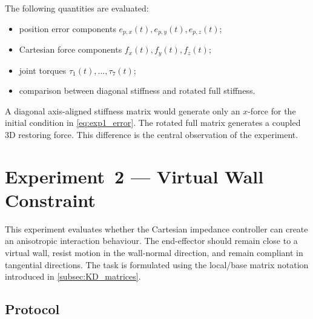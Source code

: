 The following quantities are evaluated:
\begin{itemize}
  \item position error components \(e_{p,x}(t),e_{p,y}(t),e_{p,z}(t)\);
  \item Cartesian force components \(f_x(t),f_y(t),f_z(t)\);
  \item joint torques \(\tau_1(t),\ldots,\tau_7(t)\);
  \item comparison between diagonal stiffness and rotated full stiffness.
\end{itemize}

A diagonal axis-aligned stiffness matrix would generate only an \(x\)-force for
the initial condition in \cref{eq:exp1_error}. The rotated full matrix generates
a coupled 3D restoring force. This difference is the central observation of the
experiment.


\section{Experiment~2 --- Virtual Wall Constraint}
\label{sec:exp_wall}

This experiment evaluates whether the Cartesian impedance controller can create
an anisotropic interaction behaviour. The end-effector should remain close to a
virtual wall, resist motion in the wall-normal direction, and remain compliant
in tangential directions. The task is formulated using the local/base matrix
notation introduced in \cref{subsec:KD_matrices}.

\subsection{Protocol}

